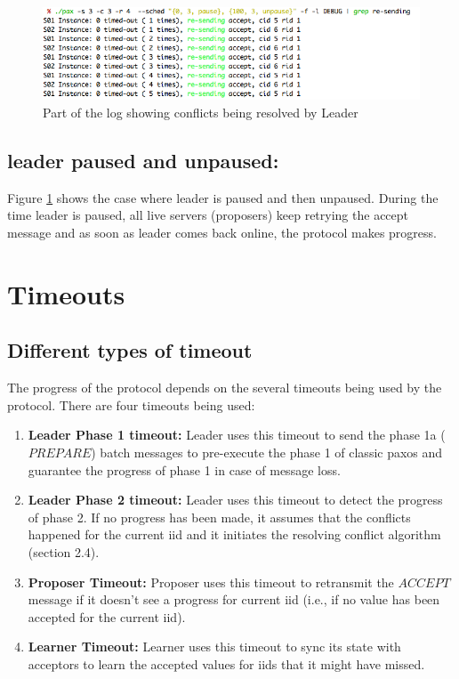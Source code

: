 \begin{figure}[ht!]
\centering
\includegraphics[width=160mm]{resending.png}
\caption{Part of the log showing conflicts being resolved by Leader}
\label{resending}
\end{figure}

\subsection{leader paused and unpaused:}
Figure \ref{resending} shows the case where leader is paused and then unpaused. During the time leader is paused, all live servers (proposers) keep retrying the accept message and as soon as leader comes back online, the protocol makes progress.

\section{Timeouts}
\subsection {Different types of timeout}
The progress of the protocol depends on the several timeouts being used by the protocol. There are four timeouts being used:
\begin{enumerate}
\item \textbf{Leader Phase 1 timeout:} Leader uses this timeout to send the phase 1a ($PREPARE$) batch messages to pre-execute the phase 1 of classic paxos and guarantee the progress of phase 1 in case of message loss.
\item \textbf{Leader Phase 2 timeout:} Leader uses this timeout to detect the progress of phase 2. If no progress has been made, it assumes that the conflicts happened for the current iid and it initiates the resolving conflict algorithm (section 2.4).
\item \textbf{Proposer Timeout:} Proposer uses this timeout to retransmit the $ACCEPT$ message if it doesn't see a progress for current iid (i.e., if no value has been accepted for the current iid).
\item \textbf{Learner Timeout:} Learner uses this timeout to sync its state with acceptors to learn the accepted values for iids that it might have missed.
\end{enumerate}

